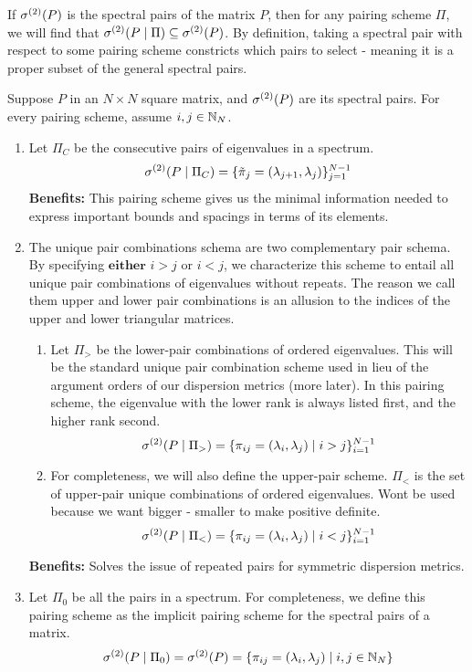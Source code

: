 \begin{remark} If ${\sigma^{(2)}}(P)$ is the spectral pairs of the matrix $P$, then for any pairing scheme $\Pi$, we will find that ${\sigma^{(2)}}(P \mid \Pi) \subseteq {\sigma^{(2)}}(P)$.
By definition, taking a spectral pair with respect to some pairing scheme constricts which pairs to select - meaning it is a proper subset of the general spectral pairs.
\end{remark}

{}

\noindent Suppose $P$ in an $N \times N$ square matrix, and ${\sigma^{(2)}}(P)$ are its spectral pairs. For every pairing scheme, assume $i,j \in \mathbb{N}_N$.

\begin{enumerate}
  \item Let $\Pi_C$ be the consecutive pairs of eigenvalues in a spectrum.
    $${\sigma^{(2)}}(P \mid \Pi_C) = \{{\tilde{\pi}}_{j} = (\lambda_{j + 1},\lambda_j)\}_{j = 1}^{N-1}$$
    \textbf{Benefits:} This pairing scheme gives us the minimal information needed to express important bounds and spacings in terms of its elements.
  \item The unique pair combinations schema are two complementary pair schema. By specifying $\textbf{either}$ $i > j$ or $i < j$,
    we characterize this scheme to entail all unique pair combinations of eigenvalues without repeats.
    The reason we call them upper and lower pair combinations is an allusion to the indices of the upper and lower triangular matrices. \begin{enumerate}
    \item Let $\Pi_>$ be the lower-pair combinations of ordered eigenvalues.
      This will be the standard unique pair combination scheme used in lieu of the argument orders of our dispersion metrics (more later).
      In this pairing scheme, the eigenvalue with the lower rank is always listed first, and the higher rank second.
    $${\sigma^{(2)}}(P \mid \Pi_>) = \{\pi_{ij} = (\lambda_i,\lambda_j) \mid i > j\}_{i = 1}^{N-1}$$
    \item For completeness, we will also define the upper-pair scheme. $\Pi_<$ is the set of upper-pair unique combinations of ordered eigenvalues.
      Wont be used because we want bigger - smaller to make positive definite.
    $${\sigma^{(2)}}(P \mid \Pi_<) = \{\pi_{ij} = (\lambda_i,\lambda_j) \mid i < j\}_{i = 1}^{N-1}$$
    \end{enumerate}
    \textbf{Benefits:} Solves the issue of repeated pairs for symmetric dispersion metrics.
  \item Let $\Pi_0$ be all the pairs in a spectrum. For completeness, we define this pairing scheme as the implicit pairing scheme for the spectral pairs of a matrix.
    $${\sigma^{(2)}}(P \mid \Pi_0) = {\sigma^{(2)}}(P) = \{\pi_{ij} = (\lambda_{i},\lambda_j) \mid i,j \in \mathbb{N}_N\}$$
\end{enumerate}

